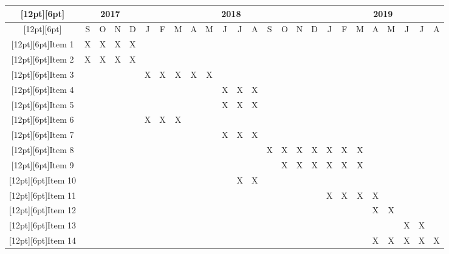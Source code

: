 \documentclass[
	12pt,				%
	oneside,			%
	a4paper,			%
	english,			%
	french,				%
	spanish,			%
	brazil,				%
	]{abntex2}
\begin{document}
\begin{landscape}
	\centering
\begin{adjustbox}{width=\textheight, totalheight=\textwidth,keepaspectratio}
\begin{tabular}{|c|c|c|c|c|c|c|c|c|c|c|c|c|c|c|c|c|c|c|c|c|c|c|c|c|}
	\hline
	\raisebox{0pt}[12pt][6pt]  & \multicolumn{4}{|c|}{2017} & \multicolumn{12}{|c|}{2018} & \multicolumn{8}{|c|}{2019} \\
	\hline
	\raisebox{0pt}[12pt][6pt]	        &S&O&N&D&J&F&M&A&M&J&J&A&S&O&N&D&J&F&M&A&M&J&J&A\\
	\hline
	\raisebox{0pt}[12pt][6pt]{Item 1}	&X&X&X&X& & & & & & & & & & & & & & & & & & & & \\
	\hline
	\raisebox{0pt}[12pt][6pt]{Item 2}   &X&X&X&X& & & & & & & & & & & & & & & & & & & & \\
	\hline
	\raisebox{0pt}[12pt][6pt]{Item 3}	& & & & &X&X&X&X&X& & & & & & & & & & & & & & & \\
	\hline
	\raisebox{0pt}[12pt][6pt]{Item 4}   & & & & & & & & & &X&X&X& & & & & & & & & & & & \\
	\hline
	\raisebox{0pt}[12pt][6pt]{Item 5}   & & & & & & & & & &X&X&X& & & & & & & & & & & & \\
	\hline
	\raisebox{0pt}[12pt][6pt]{Item 6}	& & & & &X&X&X& & & & & & & & & & & & & & & & & \\
	\hline
	\raisebox{0pt}[12pt][6pt]{Item 7}	& & & & & & & & & &X&X&X& & & & & & & & & & & & \\
	\hline
	\raisebox{0pt}[12pt][6pt]{Item 8}   & & & & & & & & & & & & &X&X&X&X&X&X&X& & & & & \\
	\hline
	\raisebox{0pt}[12pt][6pt]{Item 9}   & & & & & & & & & & & & & &X&X&X&X&X&X& & & & & \\
	\hline
	\raisebox{0pt}[12pt][6pt]{Item 10}  & & & & & & & & & & &X&X& & & & & & & & & & & & \\
	\hline
	\raisebox{0pt}[12pt][6pt]{Item 11}	& & & & & & & & & & & & & & & & &X&X&X&X& & & & \\
	\hline
	\raisebox{0pt}[12pt][6pt]{Item 12}  & & & & & & & & & & & & & & & & & & & &X&X& & & \\
	\hline
	\raisebox{0pt}[12pt][6pt]{Item 13}  & & & & & & & & & & & & & & & & & & & & & &X&X& \\
	\hline
	\raisebox{0pt}[12pt][6pt]{Item 14}  & & & & & & & & & & & & & & & & & & & &X&X&X&X&X\\
	\hline
\end{tabular}
\end{adjustbox}
\end{landscape}
\end{document}
